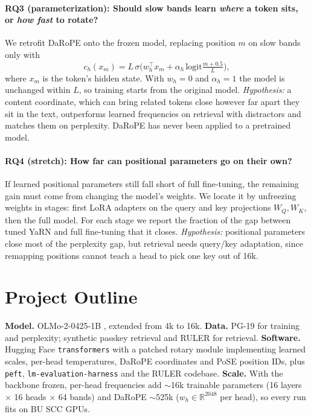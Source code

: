 \documentclass[11pt]{article}
\begin{document}
\paragraph{RQ3 (parameterization): Should slow bands learn \emph{where} a token sits, or \emph{how fast} to rotate?}
We retrofit DaRoPE onto the frozen model, replacing position $m$ on slow bands only with
\begin{equation}
c_h(x_m) = L\,\sigma\!\big(w_h^\top x_m + \alpha_h\,\mathrm{logit}\tfrac{m+0.5}{L}\big),
\end{equation}
where $x_m$ is the token's hidden state. With $w_h=0$ and $\alpha_h=1$ the model is unchanged within $L$, so training starts from the original model. \emph{Hypothesis:} a content coordinate, which can bring related tokens close however far apart they sit in the text, outperforms learned frequencies on retrieval with distractors and matches them on perplexity. DaRoPE has never been applied to a pretrained model.

\paragraph{RQ4 (stretch): How far can positional parameters go on their own?}
If learned positional parameters still fall short of full fine-tuning, the remaining gain must come from changing the model's weights. We locate it by unfreezing weights in stages: first LoRA adapters \citep{hu2022lora} on the query and key projections $W_Q, W_K$, then the full model. For each stage we report the fraction of the gap between tuned YaRN and full fine-tuning that it closes. \emph{Hypothesis:} positional parameters close most of the perplexity gap, but retrieval needs query/key adaptation, since remapping positions cannot teach a head to pick one key out of 16k.

\section{Project Outline}

\textbf{Model.} OLMo-2-0425-1B \citep{olmo2024olmo2}, extended from 4k to 16k.
\textbf{Data.} PG-19 \citep{rae2020pg19} for training and perplexity; synthetic passkey retrieval \citep{mohtashami2023landmark} and RULER \citep{hsieh2024ruler} for retrieval.
\textbf{Software.} Hugging Face \texttt{transformers} \citep{wolf2020transformers}
with a patched rotary module implementing learned scales, per-head temperatures,
DaRoPE coordinates and PoSE position IDs, plus \texttt{peft}, \texttt{lm-evaluation-harness} and the RULER codebase.
\textbf{Scale.} With the backbone frozen, per-head frequencies add ${\sim}$16k trainable parameters (16 layers $\times$ 16 heads $\times$ 64 bands) and DaRoPE ${\sim}$525k ($w_h\in\mathbb{R}^{2048}$ per head), so every run fits on BU SCC GPUs.
\end{document}
